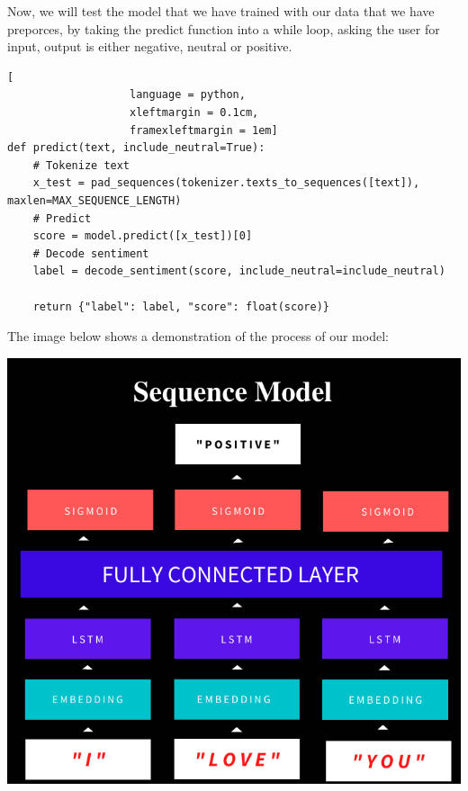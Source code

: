 

Now, we will test the model that we have trained with our data that we have preporces, by taking the predict function into a while loop, asking the user for input,   output is either negative, neutral or positive.

 
\begin{lstlisting}[
                   language = python,
                   xleftmargin = 0.1cm,
                   framexleftmargin = 1em]
def predict(text, include_neutral=True):
    # Tokenize text
    x_test = pad_sequences(tokenizer.texts_to_sequences([text]), maxlen=MAX_SEQUENCE_LENGTH)
    # Predict
    score = model.predict([x_test])[0]
    # Decode sentiment
    label = decode_sentiment(score, include_neutral=include_neutral)

    return {"label": label, "score": float(score)}
 \end{lstlisting}
 
 The image below shows a demonstration of the process of our model:
\begin{center}
\includegraphics[scale=0.6]{SequenceModel.png}
\end{center}

